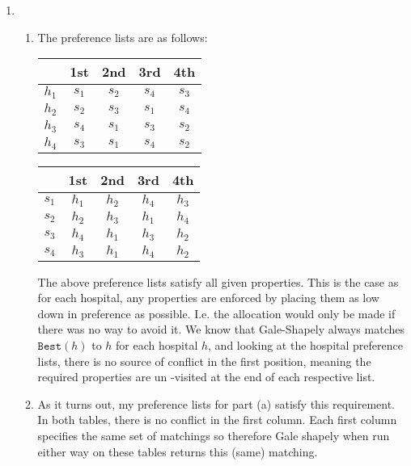 \documentclass{article}
\begin{document}
\begin{enumerate}
\begin{enumerate}
        \end{enumerate}
  \item

        \begin{enumerate}
          \item The preference lists are as follows:


        \begin{center}
        \begin{tabular}{ | c | c | c | c | c | }
          \hline
          & 1st & 2nd & 3rd & 4th \\
          \hline
          $h_{1}$ & $s_{1}$ & $s_{2}$ & $s_{4}$ & $s_{3}$ \\
          \hline
          $h_{2}$ & $s_{2}$ & $s_{3}$ & $s_{1}$ & $s_{4}$\\
          \hline
          $h_{3}$ & $s_{4}$ & $s_{1}$ & $s_{3}$ & $s_{2}$ \\
          \hline
          $h_{4}$ & $s_{3}$ & $s_{1}$ & $s_{4}$ & $s_{2}$\\
          \hline
        \end{tabular}
      \end{center}


        \begin{center}
        \begin{tabular}{ | c | c | c | c | c | }
          \hline
          & 1st & 2nd & 3rd & 4th \\
          \hline
          $s_{1}$ & $h_{1}$ & $h_{2}$ & $h_{4}$ & $h_{3}$ \\
          \hline
          $s_{2}$ & $h_{2}$ & $h_{3}$ & $h_{1}$ & $h_{4}$\\
          \hline
          $s_{3}$ & $h_{4}$ & $h_{1}$ & $h_{3}$ & $h_{2}$ \\
          \hline
          $s_{4}$ & $h_{3}$ & $h_{1}$ & $h_{4}$ & $h_{2}$\\
          \hline
        \end{tabular}
        \end{center}

                The above preference lists satisfy all given properties. This is the case as for each hospital, any properties are enforced by placing them as low down in preference as possible. I.e. the allocation would only be made if there was no way to avoid it. We know that Gale-Shapely always matches $\texttt{Best}(h) $ to $h$ for each hospital $h$, and looking at the hospital preference lists, there is no source of conflict in the first position, meaning the required properties are un -visited at the end of each respective list.
          \item As it turns out, my preference lists for part (a) satisfy this requirement. In both tables, there is no conflict in the first column. Each first column specifies the same set of matchings so therefore Gale shapely when run either way on these tables returns this (same) matching.




\end{enumerate}
\end{enumerate}
\end{document}
